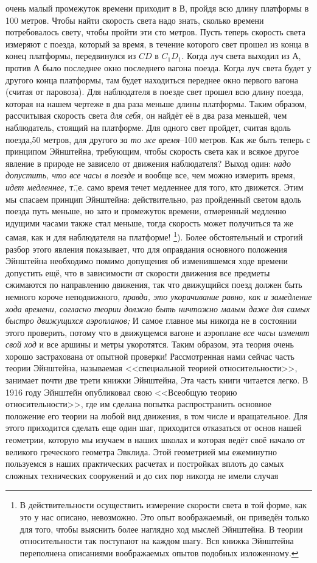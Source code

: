 очень малый промежуток времени приходит в В, пройдя всю длину платформы в 100 метров. Чтобы найти скорость света надо знать, сколько времени потребовалось свету, чтобы пройти эти сто метров. Пусть теперь скорость света измеряют с поезда, который за время, в течение которого свет прошел из конца в конец платформы, передвинулся из $ CD $ в $ C_{1}D_{1} $. Когда луч света выходил из А, против А было последнее окно последнего вагона поезда. Когда луч света будет у другого конца платформы, там будет находиться переднее окно первого вагона (считая от паровоза). Для наблюдателя в поезде свет прошел всю длину поезда, которая на нашем чертеже в два раза меньше длины платформы. Таким образом, рассчитывая скорость света \emph{для себя,} он найдёт её в два раза меньшей, чем наблюдатель, стоящий на платформе. Для одного свет пройдет, считая вдоль поезда,50 метров, для другого \emph{за то же время}\---100 метров. Как же быть теперь с принципом Эйнштейна, требующим, чтобы скорость света как и всякое другое явление в природе не зависело от движения наблюдателя? Выход один: \emph{надо допустить, что все часы в поезде} и вообще все, чем можно измерить время, \emph{идет медленнее,} т.\=,е. само время течет медленнее для того, кто движется. Этим мы спасаем принцип Эйнштейна: действительно, раз пройденный светом вдоль поезда путь меньше, но зато и промежуток времени, отмеренный медленно идущими часами также стал меньше, тогда скорость может получиться та же самая, как и для наблюдателя на платформе! \footnote{В действительности осуществить измерение скорости света в той форме, как это у нас описано, невозможно. Это опыт воображаемый, он приведён только для того, чтобы выяснить более наглядно ход мыслей Эйнштейна. В теории относительности так поступают на каждом шагу. Вся книжка Эйнштейна переполнена описаниями воображаемых опытов подобных изложенному.}). Более обстоятельный и строгий разбор этого явления показывает, что для оправдания основного положения Эйнштейна необходимо помимо допущения об изменившемся ходе времени допустить ещё, что в зависимости от скорости движения все предметы сжимаются по направлению движения, так что движущийся поезд должен быть немного короче неподвижного, \emph{правда, это укорачивание равно, как и замедление хода времени, согласно теории должно быть ничтожно малым даже для самых быстро движущихся аэропланов;} И самое главное мы никогда не в состоянии этого проверить, потому что в движущемся вагоне и аэроплане \emph{все часы изменят свой ход} и все аршины и метры укоротятся. Таким образом, эта теория очень хорошо застрахована от опытной проверки! Рассмотренная нами сейчас часть теории Эйнштейна, называемая <<специальной теорией относительности>>, занимает почти две трети книжки Эйнштейна, Эта часть книги читается легко. В 1916 году Эйнштейн опубликовал свою <<Всеобщую теорию относительности>>, где им сделана попытка распространить основное положение его теории на любой вид движения, в том числе и вращательное. Для этого приходится сделать еще один шаг, приходится отказаться от основ нашей геометрии, которую мы изучаем в наших школах и которая ведёт своё начало от великого греческого геометра Эвклида. Этой геометрией мы ежеминутно пользуемся в наших практических расчетах и постройках вплоть до самых сложных технических сооружений и до сих пор никогда не имели случая 